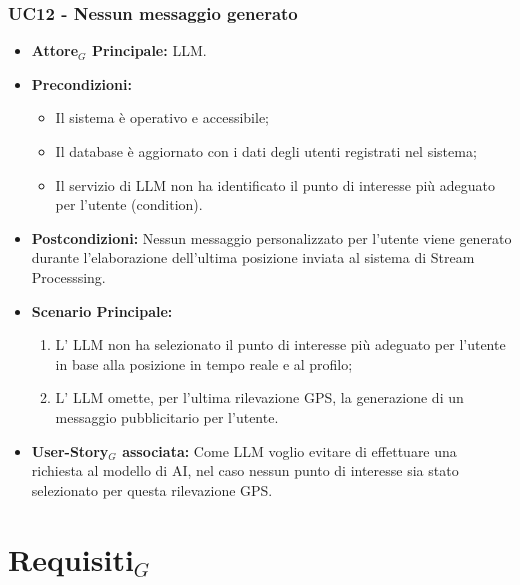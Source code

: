 \documentclass[11pt]{article}
\begin{document}
\begin{justify}

\subsubsection{\textbf{UC12 - Nessun messaggio generato}}

\label{UC12}
\begin{itemize}
    \item \textbf{Attore$_G$ Principale:} LLM.
    \item \textbf{Precondizioni:} 
        \begin{itemize}
          \item Il sistema è operativo e accessibile;
          \item Il database è aggiornato con i dati degli utenti registrati nel sistema;
          \item Il servizio di LLM non ha identificato il punto di interesse più adeguato per l'utente (condition).
        \end{itemize}
      \item \textbf{Postcondizioni:} Nessun messaggio personalizzato per l'utente viene generato durante l'elaborazione dell'ultima posizione inviata al sistema di Stream Processsing.\\
    \item \textbf{Scenario Principale:} 
        \begin{enumerate}
        \item L' LLM non ha selezionato il punto di interesse più adeguato per l'utente in base alla posizione in tempo reale e al profilo;
        \item L' LLM omette, per l'ultima rilevazione GPS, la generazione di un messaggio pubblicitario per l'utente.
        \end{enumerate}
    \item \textbf{User-Story$_G$ associata:} Come LLM voglio evitare di effettuare una richiesta al modello di AI, nel caso nessun punto di interesse sia stato selezionato per questa rilevazione GPS.
\end{itemize}



\newpage
\section{Requisiti$_G$}


\end{justify}
\end{document}
